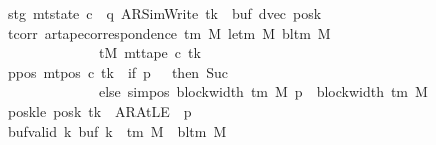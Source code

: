 \begin{isabellebody}
\ \ \ \ \ \ \ stg{\isacharcolon}{\kern0pt}\ {\isachardoublequoteopen}mt{\isacharunderscore}{\kern0pt}state\ c{\isacharprime}{\kern0pt}\ {\isacharequal}{\kern0pt}\ {\isacharparenleft}{\kern0pt}q{\isacharcomma}{\kern0pt}\ AR{\isacharunderscore}{\kern0pt}SimWrite{\isacharcomma}{\kern0pt}\ tk{\isacharcomma}{\kern0pt}\ {}{\isacharcomma}{\kern0pt}\ buf{\isacharcomma}{\kern0pt}\ dvec{\isacharcomma}{\kern0pt}\ posk{\isacharparenright}{\kern0pt}{\isachardoublequoteclose}\isanewline
\ \ \ \ \ \ \ tcorr{\isacharcolon}{\kern0pt}\ {\isachardoublequoteopen}ar{\isacharunderscore}{\kern0pt}tape{\isacharunderscore}{\kern0pt}correspondence\ {\isacharparenleft}{\kern0pt}{\isasymGamma}{\isacharunderscore}{\kern0pt}tm\ M{\isacharparenright}{\kern0pt}\ {\isacharparenleft}{\kern0pt}le{\isacharunderscore}{\kern0pt}tm\ M{\isacharparenright}{\kern0pt}\ {\isacharparenleft}{\kern0pt}bl{\isacharunderscore}{\kern0pt}tm\ M{\isacharparenright}{\kern0pt}\isanewline
\ \ \ \ \ \ \ \ \ \ \ \ \ \ \ \ \ \ \ \ tM\ {\isacharparenleft}{\kern0pt}mt{\isacharunderscore}{\kern0pt}tape\ c{\isacharprime}{\kern0pt}\ tk{\isacharparenright}{\kern0pt}{\isachardoublequoteclose}\isanewline
\ \ \ \ \ \ \ ppos{\isacharcolon}{\kern0pt}\ {\isachardoublequoteopen}mt{\isacharunderscore}{\kern0pt}pos\ c{\isacharprime}{\kern0pt}\ tk\ {\isacharequal}{\kern0pt}\ {\isacharparenleft}{\kern0pt}if\ p\ {\isacharequal}{\kern0pt}\ {}\ then\ Suc\ {}\isanewline
\ \ \ \ \ \ \ \ \ \ \ \ \ \ \ \ \ \ \ \ else\ sim{\isacharunderscore}{\kern0pt}pos\ {\isacharparenleft}{\kern0pt}block{\isacharunderscore}{\kern0pt}width\ {\isacharparenleft}{\kern0pt}{\isasymGamma}{\isacharunderscore}{\kern0pt}tm\ M{\isacharparenright}{\kern0pt}{\isacharparenright}{\kern0pt}\ p\ {\isacharplus}{\kern0pt}\ block{\isacharunderscore}{\kern0pt}width\ {\isacharparenleft}{\kern0pt}{\isasymGamma}{\isacharunderscore}{\kern0pt}tm\ M{\isacharparenright}{\kern0pt}{\isacharparenright}{\kern0pt}{\isachardoublequoteclose}\isanewline
\ \ \ \ \ \ \ poskle{\isacharcolon}{\kern0pt}\ {\isachardoublequoteopen}posk\ tk\ {\isacharequal}{\kern0pt}\ AR{\isacharunderscore}{\kern0pt}AtLE\ {\isasymlongleftrightarrow}\ p\ {\isacharequal}{\kern0pt}\ {}{\isachardoublequoteclose}\isanewline
\ \ \ \ \ \ \ buf{\isacharunderscore}{\kern0pt}valid{\isacharcolon}{\kern0pt}\ {\isachardoublequoteopen}{\isasymforall}k{\isachardot}{\kern0pt}\ buf\ k\ {\isasymin}\ {\isasymGamma}{\isacharunderscore}{\kern0pt}tm\ M\ {\isasymunion}\ {\isacharbraceleft}{\kern0pt}bl{\isacharunderscore}{\kern0pt}tm\ M{\isacharbraceright}{\kern0pt}{\isachardoublequoteclose}\isanewline

\end{isabellebody}
